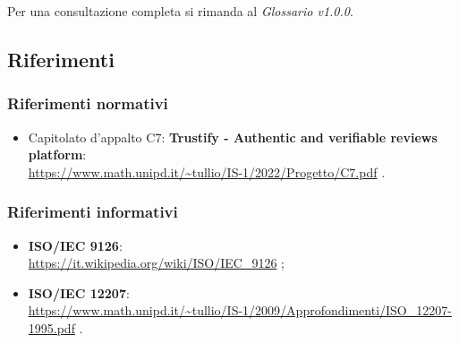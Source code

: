 Per una consultazione completa si rimanda al \textit{Glossario v1.0.0}.

\subsection{Riferimenti}
\subsubsection{Riferimenti normativi}
\begin{itemize}
    \item Capitolato d'appalto C7: \textbf{Trustify - Authentic and verifiable reviews platform}: \\
          \url{https://www.math.unipd.it/~tullio/IS-1/2022/Progetto/C7.pdf} \hfill{}. %
\end{itemize}
\subsubsection{Riferimenti informativi}
\begin{itemize}
    \item \textbf{ISO/IEC 9126}: \\
          \url{https://it.wikipedia.org/wiki/ISO/IEC_9126} \hfill{}; %
    \item \textbf{ISO/IEC 12207}: \\
          \url{https://www.math.unipd.it/~tullio/IS-1/2009/Approfondimenti/ISO_12207-1995.pdf} \hfill{}. %
\end{itemize}